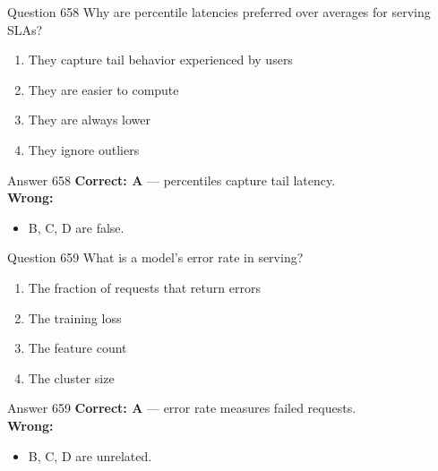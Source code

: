 \documentclass[aspectratio=169,11pt]{beamer}
\begin{document}
	\begin{frame}{Question 658}
		Why are percentile latencies preferred over averages for serving SLAs?
		\begin{enumerate}[label=\Alph*.]
			\item They capture tail behavior experienced by users
			\item They are easier to compute
			\item They are always lower
			\item They ignore outliers
		\end{enumerate}
	\end{frame}
	\begin{frame}{Answer 658}
		\textbf{Correct: A} --- percentiles capture tail latency.\\
		\vspace{0.5em}
		\textbf{Wrong:}
		\begin{itemize}
			\item B, C, D are false.
		\end{itemize}
	\end{frame}
	
	\begin{frame}{Question 659}
		What is a model's error rate in serving?
		\begin{enumerate}[label=\Alph*.]
			\item The fraction of requests that return errors
			\item The training loss
			\item The feature count
			\item The cluster size
		\end{enumerate}
	\end{frame}
	\begin{frame}{Answer 659}
		\textbf{Correct: A} --- error rate measures failed requests.\\
		\vspace{0.5em}
		\textbf{Wrong:}
		\begin{itemize}
			\item B, C, D are unrelated.
		\end{itemize}
	\end{frame}
	
\end{document}
